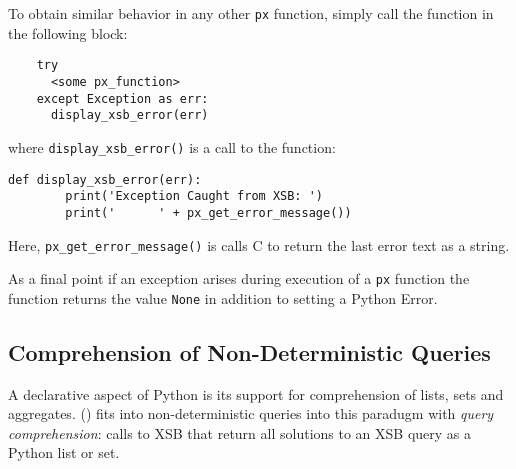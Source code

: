 \begin{example}
To obtain similar behavior in any other {\tt px} function, simply call
the function in the following block:

\begin{verbatim}
    try
      <some px_function>
    except Exception as err:
      display_xsb_error(err)
\end{verbatim}
\noindent
where {\tt display\_xsb\_error()} is a call to the function:

\begin{verbatim}
def display_xsb_error(err):    
        print('Exception Caught from XSB: ')
        print('      ' + px_get_error_message())
\end{verbatim}

\noindent
Here, {\tt px\_get\_error\_message()} is calls C to return the last
\px{} error text as a string.

As a final point if an exception arises during execution of a {\tt px}
function the function returns the value {\tt None} in addition to
setting a Python Error.
\end{example}

\subsection{Comprehension of Non-Deterministic Queries}

A declarative aspect of Python is its support for comprehension of
lists, sets and aggregates.  \px() fits into non-deterministic queries
into this paradugm with {\em query comprehension}: calls to XSB that
return all solutions to an XSB query as a Python list or set.

